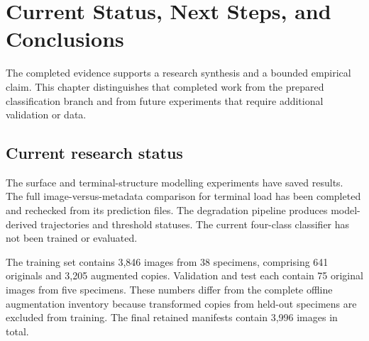 \chapter{Current Status, Next Steps, and Conclusions}\label{ch:status}
The completed evidence supports a research synthesis and a bounded empirical claim. This chapter distinguishes that completed work from the prepared classification branch and from future experiments that require additional validation or data.

\section{Current research status}
The surface and terminal-structure modelling experiments have saved results. The full image-versus-metadata comparison for terminal load has been completed and rechecked from its prediction files. The degradation pipeline produces model-derived trajectories and threshold statuses. The current four-class classifier has not been trained or evaluated.

\begin{table}[htbp]\centering
\caption{Prepared four-class total-rust manifests. Counts come from the actual retained manifests, not the larger global augmentation inventory. All 48 specimens are assigned to disjoint splits; validation and test contain originals only. These are data-preparation counts and imply no classification performance.}\label{tab:classsplits}

\end{table}
The training set contains 3,846 images from 38 specimens, comprising 641 originals and 3,205 augmented copies. Validation and test each contain 75 original images from five specimens. These numbers differ from the complete offline augmentation inventory because transformed copies from held-out specimens are excluded from training. The final retained manifests contain 3,996 images in total.

